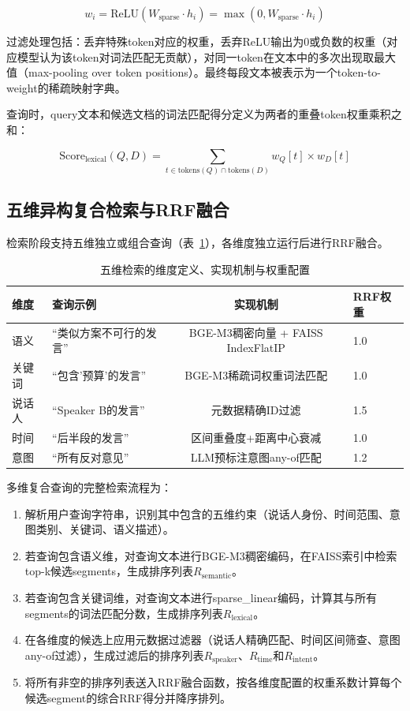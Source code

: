 \documentclass[12pt, a4paper]{article}
\begin{document}
\begin{equation}
w_i = \text{ReLU}(W_{\text{sparse}} \cdot h_i) = \max(0, W_{\text{sparse}} \cdot h_i)
\end{equation}

过滤处理包括：丢弃特殊token对应的权重，丢弃ReLU输出为0或负数的权重（对应模型认为该token对词法匹配无贡献），对同一token在文本中的多次出现取最大值（max-pooling over token positions）。最终每段文本被表示为一个token-to-weight的稀疏映射字典。

查询时，query文本和候选文档的词法匹配得分定义为两者的重叠token权重乘积之和：

\begin{equation}
\text{Score}_{\text{lexical}}(Q, D) = \sum_{t \in \text{tokens}(Q) \cap \text{tokens}(D)} w_Q[t] \times w_D[t]
\end{equation}

\subsection{五维异构复合检索与RRF融合}

检索阶段支持五维独立或组合查询（表~\ref{tab:retrieval_dims}），各维度独立运行后进行RRF融合。

\begin{table}[H]
\centering
\caption{五维检索的维度定义、实现机制与权重配置}
\label{tab:retrieval_dims}
\begin{tabular}{llcl}
\toprule
\textbf{维度} & \textbf{查询示例} & \textbf{实现机制} & \textbf{RRF权重} \\
\midrule
语义 & ``类似方案不可行的发言'' & BGE-M3稠密向量 + FAISS IndexFlatIP & 1.0 \\
关键词 & ``包含'预算'的发言'' & BGE-M3稀疏词权重词法匹配 & 1.0 \\
说话人 & ``Speaker B的发言'' & 元数据精确ID过滤 & 1.5 \\
时间 & ``后半段的发言'' & 区间重叠度+距离中心衰减 & 1.0 \\
意图 & ``所有反对意见'' & LLM预标注意图any-of匹配 & 1.2 \\
\bottomrule
\end{tabular}
\end{table}

多维复合查询的完整检索流程为：
\begin{enumerate}[label=(\arabic*)]
    \item 解析用户查询字符串，识别其中包含的五维约束（说话人身份、时间范围、意图类别、关键词、语义描述）。
    \item 若查询包含语义维，对查询文本进行BGE-M3稠密编码，在FAISS索引中检索top-k候选segments，生成排序列表$R_{\text{semantic}}$。
    \item 若查询包含关键词维，对查询文本进行sparse\_linear编码，计算其与所有segments的词法匹配分数，生成排序列表$R_{\text{lexical}}$。
    \item 在各维度的候选上应用元数据过滤器（说话人精确匹配、时间区间筛查、意图any-of过滤），生成过滤后的排序列表$R_{\text{speaker}}$、$R_{\text{time}}$和$R_{\text{intent}}$。
    \item 将所有非空的排序列表送入RRF融合函数，按各维度配置的权重系数计算每个候选segment的综合RRF得分并降序排列。
\end{enumerate}
\end{document}
